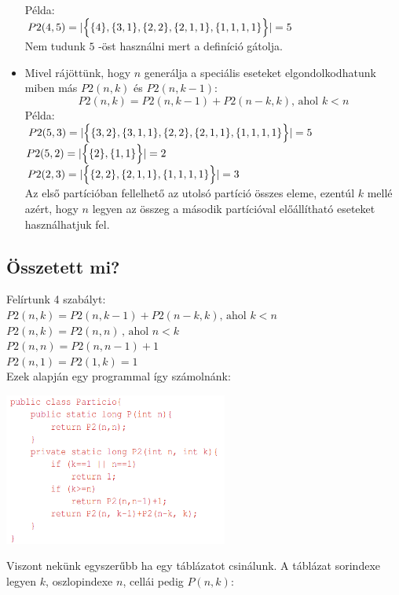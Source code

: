 \documentclass{article}
\theoremstyle{mytheoremstyle}
\theoremstyle{mytheoremstyle}
\theoremstyle{myproblemstyle}
\begin{document}
\begin{itemize}
Példa:\\
$P2(4,5) = |\Bigl\{\{4\},\{3,1\},\{2,2\},\{2,1,1\},
\{1,1,1,1\}\Bigr\}|=5$\\ 
Nem tudunk $5$ -öst használni mert a definíció gátolja.
\item
Mivel rájöttünk, hogy $n$ generálja a speciális eseteket 
elgondolkodhatunk miben más $P2(n,k)$ és $P2(n,k-1):$
$$P2(n,k) = P2(n,k-1) + P2(n-k,k)\text{, ahol }k<n$$
Példa:\\
$P2(5,3) = |\Bigl\{\{3,2\},\{3,1,1\},\{2,2\},\{2,1,1\},\{1,1,1,1\}\Bigr\}|=5$\\ 
$P2(5,2) = |\Bigl\{\{2\},\{1,1\}\Bigr\}|=2$\\ 
$P2(2,3) = |\Bigl\{\{2,2\},\{2,1,1\},\{1,1,1,1\}\Bigr\}|=3$\\ 
Az első partícióban fellelhető az utolsó partíció összes eleme, ezentúl
$k$ mellé azért, hogy $n$ legyen az összeg a második 
partícióval előállítható eseteket használhatjuk fel.

\end{itemize}
\subsection{Összetett mi?}
Felírtunk 4 szabályt:\\
$P2(n,k) = P2(n,k-1) + P2(n-k,k)\text{, ahol }k<n$\\
$P2(n,k) = P2(n,n)\,\text{, ahol }n<k$\\
$P2(n,n) = P2(n,n-1) + 1$\\
$P2(n,1) = P2(1,k) = 1$\\
Ezek alapján egy programmal így számolnánk:\\
\begin{center}
    \includegraphics[height=5cm]{particiok}
\end{center}
Viszont nekünk egyszerűbb ha egy táblázatot csinálunk. 
A táblázat sorindexe legyen $k$, oszlopindexe $n$, cellái pedig 
$P(n,k)$: 
\end{document}
